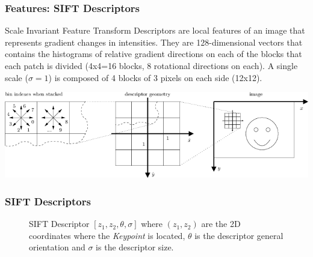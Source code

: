 \documentclass[aspectratio=169]{beamer}
\begin{document}
    \begin{frame}
    \frametitle{Features: SIFT Descriptors}
    
    Scale Invariant Feature Transform Descriptors are local features of an image that represents gradient changes in intensities.  They are 128-dimensional vectors that contains the histograms of relative gradient directions on each of the blocks that each patch is divided (4x4=16 blocks, 8 rotational directions on each).  A single scale ($ \sigma = 1 $) is composed of 4 blocks of 3 pixels on each side (12x12).
    
        \includegraphics[scale=0.5]{images/sift-conv-vlfeat.png}     
    \end{frame}
    
    \begin{frame}
        \frametitle{SIFT Descriptors}
        \begin{center}
   			\begin{figure}[thpb]
      			\centering
      			\setlength\fboxsep{0pt}
	  			\setlength\fboxrule{0.5pt}
      			\caption{\centering SIFT Descriptor $ [ z_1, z_2, \theta, \sigma ] $ where $ (z_1, z_2) $ are the 2D coordinates where the \textit{Keypoint} is located, $ \theta $ is the descriptor general orientation and $ \sigma $ is the descriptor size. }
      			\label{figure1}
   			\end{figure}        
        \end{center}
    \end{frame}   
    
\end{document}
